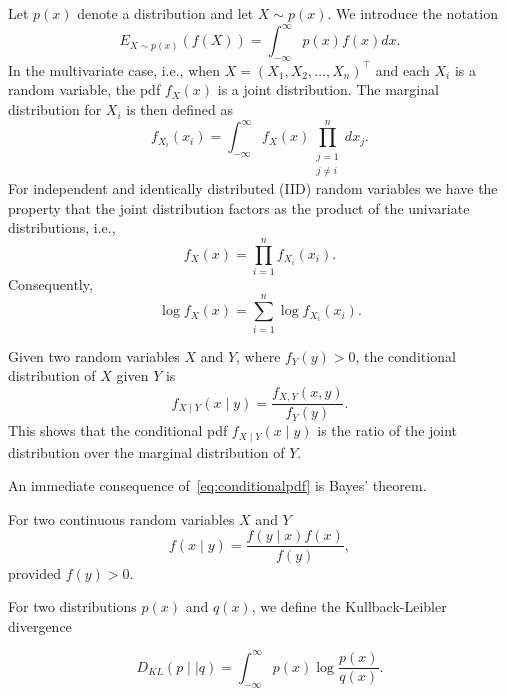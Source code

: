 \documentclass[11pt]{article}
\begin{document}
Let $p(x)$ denote a distribution and let $X\sim p(x)$. We introduce the notation 
\begin{equation}
    E_{X\sim p(x)}(f(X)) = \int_{-\infty}^{\infty}p(x)f(x)dx.
\end{equation}
In the multivariate case, i.e., when $X=(X_1, X_{2},\ldots, X_n)^{\top}$ and each $X_{i}$ is a random variable, the pdf $f_{X}(x)$ is a joint distribution. The marginal distribution for $X_{i}$ is then defined as
\begin{equation}
    f_{X_{i}}(x_{i}) = \int_{-\infty}^{\infty}f_{X}(x)\prod_{\substack{j=1 \\j\neq i}}^{n} dx_{j}.
\end{equation}
For independent and identically distributed (IID) random variables we have the property that the joint distribution factors as the product of the univariate distributions, i.e.,
\begin{equation}
    f_{X}(x) = \prod_{i=1}^{n}f_{X_{i}}(x_{i}).
\end{equation}
Consequently, 
\begin{equation}
    \log{f_{X}(x)} = \sum_{i=1}^{n}\log{f_{X_{i}}(x_{i})}.
\end{equation}

Given two random variables $X$ and $Y$, where $f_{Y}(y)>0$, the conditional distribution of $X$ given $Y$ is
\begin{equation}
    f_{X\mid Y}(x\mid y) = \frac{f_{X,Y}(x,y)}{f_{Y}(y)}.
    \label{eq:conditionalpdf}
\end{equation}
This shows that the conditional pdf $f_{X\mid Y}(x\mid y)$ is the ratio of the joint distribution over the marginal distribution of $Y$.

An immediate consequence of~\eqref{eq:conditionalpdf} is  Bayes' theorem.
\begin{theorem}
For two continuous random variables $X$ and $Y$
\begin{equation}
    f(x\mid y) = \frac{f(y\mid x)f(x)}{f(y)},
    \label{eq:Bayes}
\end{equation}
provided $f(y) > 0$.
\end{theorem}

For two distributions $p(x)$ and $q(x)$, we define the Kullback-Leibler divergence

\begin{equation}
    D_{KL}(p \mid\mid q) = \int_{-\infty}^{\infty}p(x)\log{\frac{p(x)}{q(x)}}.
    \label{eq:KLDivergence}
\end{equation}
\end{document}
